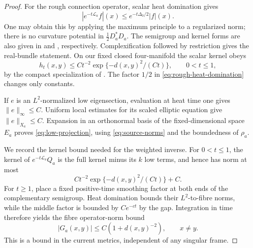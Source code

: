 \begin{proof}
For the rough connection operator, scalar heat domination gives
\begin{equation}\label{eq:rough-heat-domination}
 |e^{-t\mathcal L_a}f|(x)
 \le e^{-t\Delta_0/2}|f|(x).
\end{equation}
One may obtain this by applying the maximum principle to a
regularized norm; there is no curvature potential in
\(\frac12D_a^*D_a\). The semigroup and kernel forms are also
given in \cite[Theorem~2.13]{Guneysu12} and
\cite[Theorem~8.8(b), Remark~8.9]{Guneysu11}, respectively.
Complexification followed by restriction gives the real-bundle
statement. On our fixed closed four-manifold the scalar kernel
obeys
\[
 h_t(x,y)\le Ct^{-2}\exp\{-d(x,y)^2/(Ct)\},
 \qquad 0<t\le1,
\]
by the compact specialization of \cite[Corollary~3.1]{LiYau86}.
The factor \(1/2\) in \eqref{eq:rough-heat-domination} changes
only constants.

If \(e\) is an \(L^2\)-normalized low eigensection, evaluation
at heat time one gives \(\|e\|_\infty\le C\).
Uniform local estimates for its scaled elliptic equation
give \(\|e\|_{X_a}\le C\). Expansion in an orthonormal
basis of the fixed-dimensional space \(E_a\) proves
\eqref{eq:low-projection}, using \eqref{eq:source-norms}
and the boundedness of \(\rho_a\).

We record the kernel bound needed for the weighted inverse.
For \(0<t\le1\), the kernel of \(e^{-t\mathcal L_a}Q_a\)
is the full kernel minus its \(k\) low terms, and hence has
norm at most
\[
 Ct^{-2}\exp\{-d(x,y)^2/(Ct)\}+C.
\]
For \(t\ge1\), place a fixed positive-time smoothing factor at
both ends of the complementary semigroup. Heat domination
bounds their \(L^2\)-to-fibre norms, while the middle factor
is bounded by \(Ce^{-ct}\) by the gap. Integration in time
therefore yields the fibre operator-norm bound
\begin{equation}\label{eq:green-kernel}
 |G_a(x,y)|\le C(1+d(x,y)^{-2}),\qquad x\ne y.
\end{equation}
This is a bound in the current metrics, independent of any
singular frame.


\end{proof}
